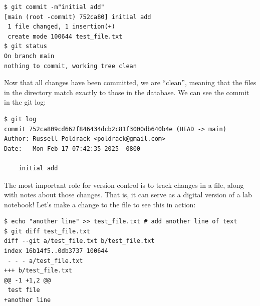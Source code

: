 
\begin{lstlisting}[style=shell]
$ git commit -m"initial add"
[main (root -commit) 752ca80] initial add
 1 file changed, 1 insertion(+)
 create mode 100644 test_file.txt
$ git status
On branch main
nothing to commit, working tree clean
\end{lstlisting}

Now that all changes have been committed, we are ``clean'', meaning that the files in the directory match exactly to those in the database.
We can see the commit in the git log:

\begin{lstlisting}[style=shell]
$ git log
commit 752ca809cd662f846434dcb2c81f3000db640b4e (HEAD -> main)
Author: Russell Poldrack <poldrack@gmail.com>
Date:   Mon Feb 17 07:42:35 2025 -0800

    initial add
\end{lstlisting}


The most important role for version control is to track changes in a file, along with notes about those changes.
That is, it can serve as a digital version of a lab notebook! Let's make a change to the file to see this in action:

\begin{lstlisting}[style=shell]
$ echo "another line" >> test_file.txt # add another line of text
$ git diff test_file.txt
diff --git a/test_file.txt b/test_file.txt
index 16b14f5..0db3737 100644
 - - - a/test_file.txt
+++ b/test_file.txt
@@ -1 +1,2 @@
 test file
+another line
\end{lstlisting}


